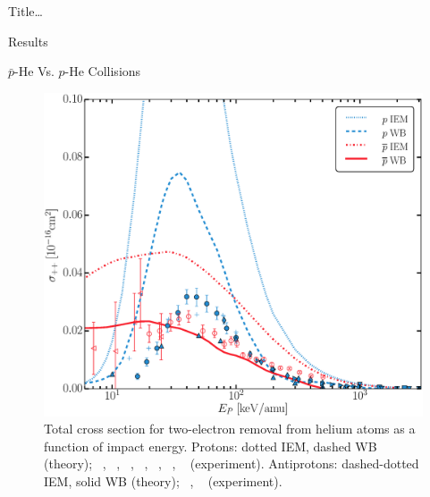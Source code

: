 \documentclass[letterpaper, 11 pt]{report}
\begin{document}
\begin{chapter}{ Title\dots \label{chap:p-he2p-he}}
\begin{section}{Results \label{sec:phe2p-res}}
\begin{subsection}{ \texorpdfstring{$\bar{p}$}{pbar}-He Vs. \texorpdfstring{$p$}{p}-He Collisions
                         \label{sec:pbarhe-res}}
\begin{figure}[ht]
\begin{minipage}{.49\linewidth}
               \centering
               \includegraphics[width = \linewidth]{./images/pbarhe/pbarhe-++.eps}
               \caption[Total cross section for two-electron removal from helium atoms as a function of
                        impact energy]
                       {Total cross section for two-electron removal from helium atoms as a function
                        of impact energy. Protons: dotted IEM, dashed WB (theory);
                        {\color{blue}{$\blacktriangle$}}~\cite{DTR84}, {\color{blue}{$+$}}~\cite{Sol62},
                        {\color{blue}{$\bullet$}}~\cite{SG89},
                        {\color{blue}{$\blacklozenge$}}~\cite{SG85},
                       {\color{blue}{$\blacktriangleright$}}~\cite{PM70},
                       {\color{blue}{$\blacktriangledown$}}~\cite{Wex64},
                       {\color{blue}{$\blacksquare$}}~\cite{KAH84} (experiment).
                       Antiprotons: dashed-dotted IEM, solid WB (theory);
                       {\color{red}{$\circ$}}~\cite{HKM94}, {\color{red}{$\triangleleft$}}~\cite{KKT09}
                       (experiment). \label{fig:he++}}
            \end{minipage}
         \end{figure}


\end{subsection}
\end{section}
\end{chapter}
\end{document}
